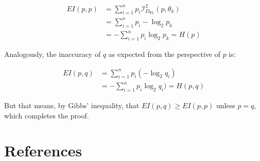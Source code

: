 \documentclass[
  letterpaper,
  DIV=11,
  numbers=noendperiod]{scrartcl}
\newcommand{\dkl}{D_{\mathsf{KL}}} %
\begin{document}
\begin{align*}
EI(p,p) & = \sum_{i =1}^n p_i \mathcal{I}_{\dkl}^2(p, \theta_k) \\
& = \sum_{i =1}^n  p_i - \log_2 p_k \\
& = - \sum_{i =1}^n  p_i  \log_2 p_k = H(p)
\end{align*}

\noindent Analogously, the inaccuracy of \(q\) as expected from the
perspective of \(p\) is:

\begin{align*}
EI(p, q) & =   \sum_{i =1}^n p_i \left( - \log_2 q_i\right)\\
& = -  \sum_{i =1}^n p_i  \log_2 q_i) = H(p,q)
\end{align*}

But that means, by Gibbs' inequality, that \(EI(p,q) \geq EI(p,p)\)
unless \(p=q\), which completes the proof.

\hypertarget{references}{%
\section*{References}\label{references}}
\end{document}
